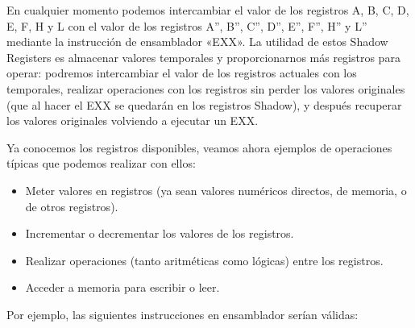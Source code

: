 \documentclass[letterpaper,10pt,spanish]{sphinxmanual}
\begin{document}
En cualquier momento podemos intercambiar el valor de los registros A, B, C, D, E, F, H y L con el valor de los registros A”, B”, C”, D”, E”, F”, H” y L” mediante la instrucción de ensamblador «EXX». La utilidad de estos Shadow Registers es almacenar valores temporales y proporcionarnos más registros para operar: podremos intercambiar el valor de los registros actuales con los temporales, realizar operaciones con los registros sin perder los valores originales (que al hacer el EXX se quedarán en los registros Shadow), y después recuperar los valores originales volviendo a ejecutar un EXX.

Ya conocemos los registros disponibles, veamos ahora ejemplos de operaciones típicas que podemos realizar con ellos:
\begin{itemize}
\item {} 
Meter valores en registros (ya sean valores numéricos directos, de memoria, o de otros registros).

\item {} 
Incrementar o decrementar los valores de los registros.

\item {} 
Realizar operaciones (tanto aritméticas como lógicas) entre los registros.

\item {} 
Acceder a memoria para escribir o leer.

\end{itemize}

Por ejemplo, las siguientes instrucciones en ensamblador serían válidas:

\begin{sphinxVerbatim}[commandchars=\\\{\}]
         
         
           
      
        
     
     
          
            
           
\end{sphinxVerbatim}
\end{document}
